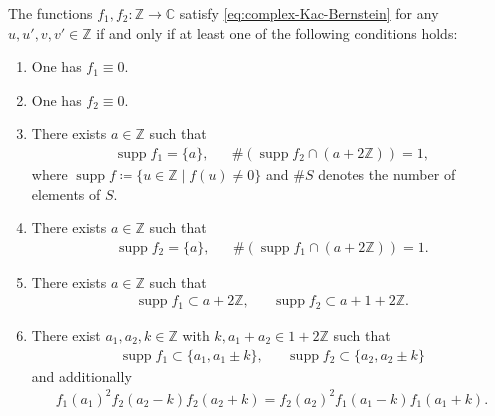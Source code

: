 \documentclass[10pt,a4paper]{amsart}
\DeclareMathOperator{\supp}{supp}
\begin{document}
\begin{theorem}
    \label{thm:Z-characterize}

The functions $ f_1 , f_2 \colon \mathbb{ Z } \to \mathbb{ C } $ satisfy \eqref{eq:complex-Kac-Bernstein} for any $ u , u' , v , v' \in \mathbb{ Z } $ if and only if at least one of the following conditions holds:

\begin{enumerate}
  \item \label{item:Z-characterize-f1-zero}
  
  One has $ f_1 \equiv 0 $.

  \item \label{item:Z-characterize-f2-zero}
  
  One has $ f_2 \equiv 0 $.

\item \label{item:Z-characterize-f1-one-point}

There exists $ a \in \mathbb{ Z } $ such that
\begin{align}
    \supp f_1 = \{ a \} , & & 
    \# ( \supp f_2 \cap ( a + 2 \mathbb{ Z } ) ) = 1,
\end{align}
where $ \supp f \coloneqq \{ u \in \mathbb{ Z } \mid f ( u ) \neq 0 \} $ and $ \# S $ denotes the number of elements of $ S $.

\item \label{item:Z-characterize-f2-one-point}

There exists $ a \in \mathbb{ Z } $ such that
\begin{align}
    \supp f_2 = \{ a \} , & &
    \# ( \supp f_1 \cap ( a + 2 \mathbb{ Z } ) ) = 1.
\end{align}

\item \label{item:Z-characterize-independent}

There exists $ a \in \mathbb{ Z } $ such that
\begin{align}
  \supp f_1 \subset a + 2 \mathbb{ Z }, & &
  \supp f_2 \subset a + 1 + 2 \mathbb{ Z }.
\end{align}

\item \label{item:Z-characterize-six-point}

There exist $ a_1 , a_2 , k \in \mathbb{ Z } $ with $ k , a_1 + a_2 \in 1 + 2 \mathbb{ Z } $ such that
\begin{align}
    \supp f_1 \subset \{ a_1 , a_1 \pm k \}, &  &
\supp f_2 \subset \{ a_2 , a_2 \pm k \} \label{eq:Z-characterize-six-point-support}
\end{align}
and additionally
\begin{align}
    f_1 ( a_1 )^2 f_2 ( a_2 - k ) f_2 ( a_2 + k ) = f_2 ( a_2 )^2 f_1 ( a_1 - k ) f_1 ( a_1 + k ). \label{eq:Z-characterize-six-point-equation}
\end{align}


\end{enumerate}
\end{theorem}
\end{document}
